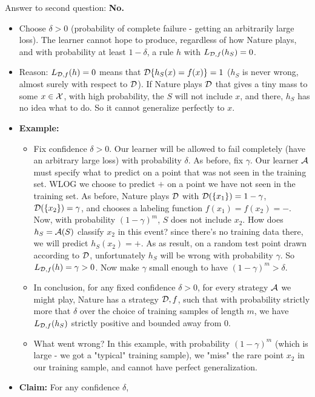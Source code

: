 {Answer to second question: {\bf No.}
 \begin{itemize}%
  \item Choose $\delta>0$ (probability of complete failure - getting an
    arbitrarily large loss). The learner cannot
    hope to produce, regardless of how Nature plays, and with probability at
    least $1-\delta$, a
     rule $h$ with $L_{\mathcal{D},f}(h_S)=0$.
   \item Reason: $L_{\mathcal{D},f}(h)=0$ means that $\mathcal{D}\{h_S(x)= f(x)\}=1$
     ($h_S$ is never wrong, almost surely with respect to $\mathcal{D}$). 
     If Nature plays $\mathcal{D}$ that gives a
     tiny mass to some $x\in\mathcal{X}$, with high probability, the
     $S$ will not include $x$, and there, $h_S$ has no
     idea what to do. So it cannot generalize perfectly to $x$.
    \item {\bf Example:}
    \begin{itemize}
        \item Fix confidence $\delta>0$. Our learner will be allowed to fail
	  completely (have an arbitrary large loss) with probability $\delta$.
	  As before, fix $\gamma$. Our learner $\mathcal{A}$ must specify what to predict on a point that was not seen in the training set. WLOG we choose to predict $+$ on a point we have not seen in the training set. As before, Nature plays $\mathcal{D}$ with
     $\mathcal{D}(\{x_1\}) = 1-\gamma$, $\mathcal{D}(\{x_2\}) = \gamma$, and chooses a labeling function $f(x_1)=f(x_2)=-$. 
    Now, with probability
     $(1-\gamma)^m$, $S$ does not include $x_2$. 
     How does $h_S=\mathcal{A}(S)$
     classify $x_2$ in this event? since there's no training data there, we will predict $h_S(x_2)=+$.
     As as result, on a random test point drawn according to $\mathcal{D}$, unfortunately $h_S$ will be wrong with probability $\gamma$. So
     $L_{\mathcal{D},f}(h)=\gamma>0$. Now make $\gamma$ small enough to have $(1-\gamma)^m > \delta$.
     \item In conclusion, for any fixed confidence $\delta>0$, 
     for every strategy $\mathcal{A}$ we might play, Nature has a strategy $\mathcal{D},f$, such that 
     with probability strictly more that $\delta$ over the choice of training samples of length $m$, we have  
     $L_{\mathcal{D},f}(h_S)$ strictly positive and bounded away from $0$.
     \item What went wrong? In this example, with probability $(1-\gamma)^m$ (which is large - we got a "typical" training sample), we "miss" the rare point $x_2$ in our training sample, and cannot have perfect generalization. 
     \end{itemize}
  \item {\bf Claim:} For any confidence $\delta$, 

\end{itemize}}
